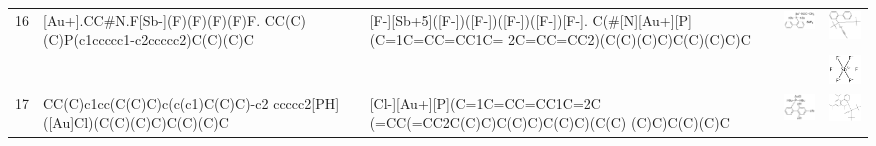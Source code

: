 \begin{landscape}
\begin{longtable}{m{0.3cm}m{6.7cm}m{7.7cm}m{2.3cm}m{2.3cm}}
 16 &
 [Au+].CC\#N.F[Sb-](F)(F)(F)(F)F. CC(C)(C)P(c1ccccc1-c2ccccc2)C(C)(C)C & 
 [F-][Sb+5]([F-])([F-])([F-])([F-])[F-]. C(\#[N][Au+][P](C=1C=CC=CC1C= 2C=CC=CC2)(C(C)(C)C)C(C)(C)C)C & 
 \includegraphics[width=2.2cm]{imagenes/sigmaAldrich/(Acetonitrile)[(2-biphenyl)di-tert-butylphosphine]gold(I) hexafluoroantimonate.jpeg} & 
 \includegraphics[width=2.2cm]{imagenes/sciFinder/pdf/(Acetonitrile)[(2-biphenyl)di-tert-butylphosphine]gold(I) hexafluoroantimonate [1compuesto].pdf} \\
  &  &  &  &
 \includegraphics[width=2.2cm]{imagenes/sciFinder/pdf/(Acetonitrile)[(2-biphenyl)di-tert-butylphosphine]gold(I) hexafluoroantimonate [2compuesto].pdf} \\



 17 &
 CC(C)c1cc(C(C)C)c(c(c1)C(C)C)-c2 ccccc2[PH]([Au]Cl)(C(C)(C)C)C(C)(C)C & 
 [Cl-][Au+][P](C=1C=CC=CC1C=2C (=CC(=CC2C(C)C)C(C)C)C(C)C)(C(C) (C)C)C(C)(C)C & 
 \includegraphics[width=2.2cm]{imagenes/sigmaAldrich/Chloro[2-di-tert-butyl(2,4,6-triisopropylbiphenyl)phosphine] gold(I).jpeg} & 
 \includegraphics[width=2.3cm]{imagenes/sciFinder/pdf/Chloro[2-di-tert-butyl(2,4,6-triisopropylbiphenyl)phosphine] gold(I).pdf} \\




\end{longtable}
\end{landscape}
